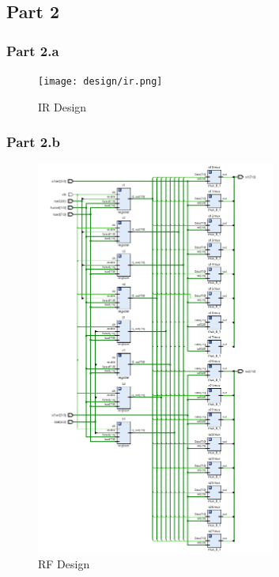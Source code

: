 \documentclass[pdftex,12pt,a4paper]{article}
\begin{document}
\subsection{Part 2}
\subsubsection{Part 2.a}
\begin{figure}[H]
	\centering
	\texttt{[image: design/ir.png]}	
	\caption{IR Design}
	\label{IR Design}
\end{figure}


\subsubsection{Part 2.b}
\begin{figure}[H]
	\centering
	\includegraphics[width=0.7\textwidth]{design/rf.png}	
	\caption{RF Design}
	\label{RF Design}
\end{figure}
\end{document}
